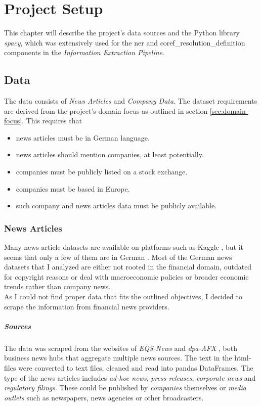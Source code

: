 \chapter{Project Setup}\label{ch:project_setup}
This chapter will describe the project's data sources and the Python library \emph{spacy}, which was extensively used for the \gls{ner} and \gls{coref_resolution_definition} components in the \emph{Information Extraction Pipeline}.

\section{Data}\label{sec:data}
The data consists of \emph{News Articles} and \emph{Company Data}.
The dataset requirements are derived from the project's domain focus as outlined in section \ref{sec:domain-focus}.
This requires that
\begin{itemize}
	\item news articles must be in German language.
	\item news articles should mention companies, at least potentially.
	\item companies must be publicly listed on a stock exchange.
	\item companies must be based in Europe.
    \item such company and news articles data must be publicly available.
\end{itemize}

\subsection{News Articles}
Many news article datasets are available on platforms such as Kaggle \cite{kaggle}, but it seems that only a few of them are in German \cite{kaggle}.
Most of the German news datasets that I analyzed are either not rooted in the financial domain, outdated for copyright reasons or
deal with macroeconomic policies or broader economic trends rather than company news.\\

As I could not find proper data that fits the outlined objectives, I decided to scrape the information from financial news providers.

\paragraph{Sources}\label{par:sources}
The data was scraped from the websites of \emph{EQS-News} \cite{WebsiteEQSNews} and \emph{dpa-AFX} \cite{WebsiteDPAAFX}, both business news hubs that aggregate multiple news sources.
The text in the html-files were converted to text files, cleaned and read into pandas \cite{pandas} DataFrames.
The type of the news articles includes \emph{ad-hoc news}, \emph{press releases}, \emph{corporate news} and \emph{regulatory filings}.
These could be published by \emph{companies} themselves or \emph{media outlets} such as newspapers, news agencies or other broadcasters.


